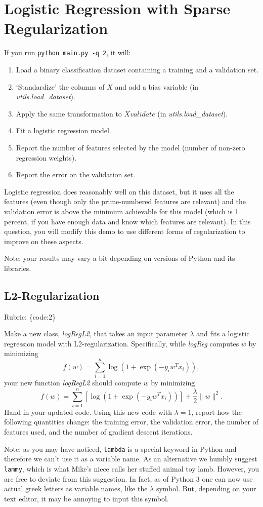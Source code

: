\documentclass{article}
\def\rubric#1{\gre{Rubric: \{#1\}}}{}
\def\blu#1{{\color{blu}#1}}
\def\gre#1{{\color{gre}#1}}
\def\norm#1{\|#1\|}
\def\enum#1{\begin{enumerate}#1\end{enumerate}}
\begin{document}
\section{Logistic Regression with Sparse Regularization}

If you run  \verb|python main.py -q 2|, it will:
\enum{
\item Load a binary classification dataset containing a training and a validation set.
\item `Standardize' the columns of $X$ and add a bias variable (in \emph{utils.load\_dataset}).
\item Apply the same transformation to $Xvalidate$ (in \emph{utils.load\_dataset}).
\item Fit a logistic regression model.
\item Report the number of features selected by the model (number of non-zero regression weights).
\item Report the error on the validation set.
}
Logistic regression does reasonably well on this dataset,
but it uses all the features (even though only the prime-numbered features are relevant)
and the validation error is above the minimum achievable for this model
(which is 1 percent, if you have enough data and know which features are relevant).
In this question, you will modify this demo to use different forms of regularization
 to improve on these aspects.

Note: your results may vary a bit depending on versions of Python and its libraries.


\subsection{L2-Regularization}
\rubric{code:2}

Make a new class, \emph{logRegL2}, that takes an input parameter $\lambda$ and fits a logistic regression model with L2-regularization. Specifically, while \emph{logReg} computes $w$ by minimizing
\[
f(w) = \sum_{i=1}^n \log(1+\exp(-y_iw^Tx_i)),
\]
your new function \emph{logRegL2} should compute $w$ by minimizing
\[
f(w) = \sum_{i=1}^n \left[\log(1+\exp(-y_iw^Tx_i))\right] + \frac{\lambda}{2}\norm{w}^2.
\]
\blu{Hand in your updated code. Using this new code with $\lambda = 1$, report how the following quantities change: the training error, the validation error, the number of features used, and the number of gradient descent iterations.}

Note: as you may have noticed, \texttt{lambda} is a special keyword in Python and therefore we can't use it as a variable name.
As an alternative we humbly suggest \texttt{lammy}, which is what Mike's niece calls her stuffed animal toy lamb.
However, you are free to deviate from this suggestion. In fact, as of Python 3 one can now use actual greek letters as variable names, like the $\lambda$ symbol. But, depending on your text editor, it may be annoying to input this symbol.
\end{document}
